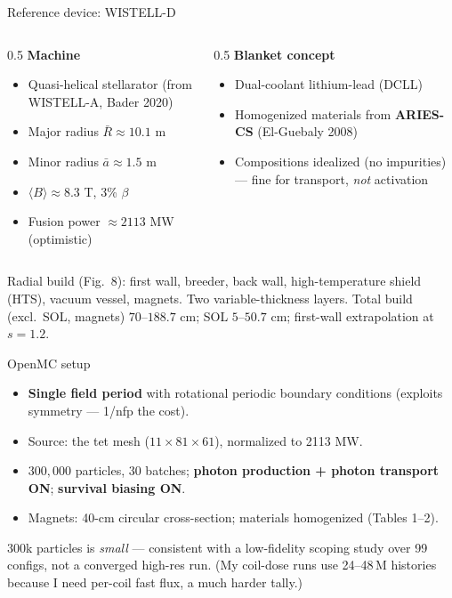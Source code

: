 \documentclass[aspectratio=169]{beamer}
\newcommand{\kb}[1]{\begin{tcolorbox}[colback=key!5,colframe=key!60,boxsep=2pt,left=4pt,right=4pt,top=3pt,bottom=3pt]#1\end{tcolorbox}}
\newcommand{\wb}[1]{\begin{tcolorbox}[colback=warn!5,colframe=warn!55,boxsep=2pt,left=4pt,right=4pt,top=3pt,bottom=3pt]#1\end{tcolorbox}}
\begin{document}
\begin{frame}{Reference device: WISTELL-D}
  \begin{columns}[t]
    \begin{column}{0.5\textwidth}
      \textbf{Machine}
      \begin{itemize}\small
        \item Quasi-helical stellarator (from WISTELL-A, Bader 2020)
        \item Major radius $\bar R \approx 10.1$ m
        \item Minor radius $\bar a \approx 1.5$ m
        \item $\langle B\rangle \approx 8.3$ T, 3\% $\beta$
        \item Fusion power $\approx 2113$ MW (optimistic)
      \end{itemize}
    \end{column}
    \begin{column}{0.5\textwidth}
      \textbf{Blanket concept}
      \begin{itemize}\small
        \item Dual-coolant lithium-lead (DCLL)
        \item Homogenized materials from \textbf{ARIES-CS} (El-Guebaly 2008)
        \item Compositions idealized (no impurities) --- fine for transport, \emph{not} activation
      \end{itemize}
    \end{column}
  \end{columns}
  \vspace{0.4em}
  \kb{\footnotesize Radial build (Fig.~8): first wall, breeder, back wall, high-temperature shield (HTS), vacuum vessel, magnets. Two variable-thickness layers. Total build (excl.\ SOL, magnets) $70$--$188.7$ cm; SOL $5$--$50.7$ cm; first-wall extrapolation at $s=1.2$.}
\end{frame}

\begin{frame}{OpenMC setup}
  \begin{itemize}
    \item \textbf{Single field period} with rotational periodic boundary conditions (exploits symmetry --- 1/nfp the cost).
    \item Source: the tet mesh ($11\times81\times61$), normalized to 2113 MW.
    \item $300{,}000$ particles, $30$ batches; \textbf{photon production + photon transport ON}; \textbf{survival biasing ON}.
    \item Magnets: 40-cm circular cross-section; materials homogenized (Tables 1--2).
  \end{itemize}
  \wb{\footnotesize $300$k particles is \emph{small} --- consistent with a low-fidelity scoping study over 99 configs, not a converged high-res run. (My coil-dose runs use 24--48\,M histories because I need per-coil fast flux, a much harder tally.)}
\end{frame}
\end{document}
